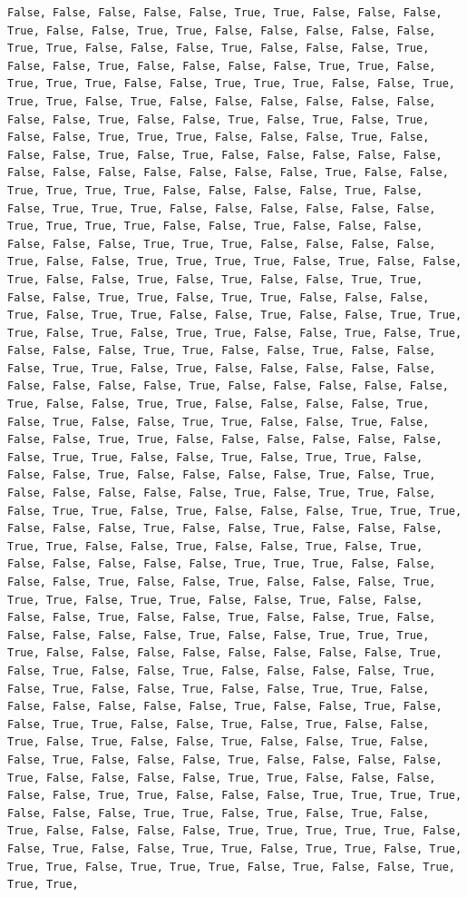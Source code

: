 \documentclass[
  letterpaper,
  DIV=11,
  numbers=noendperiod]{scrartcl}
\begin{document}
\begin{verbatim}
False, False, False, False, False, True, True, False, False, False, True, False, False, True, True, False, False, False, False, False, True, True, False, False, False, True, False, False, False, True, False, False, True, False, False, False, False, True, True, False, True, True, True, False, False, True, True, True, False, False, True, True, True, False, True, False, False, False, False, False, False, False, False, True, False, False, True, False, True, False, True, False, False, True, True, True, False, False, False, True, False, False, False, True, False, True, False, False, False, False, False, False, False, False, False, False, False, False, True, False, False, True, True, True, True, False, False, False, False, True, False, False, True, True, True, False, False, False, False, False, False, True, True, True, True, False, False, True, False, False, False, False, False, False, True, True, True, False, False, False, False, True, False, False, True, True, True, True, False, True, False, False, True, False, False, True, False, True, False, False, True, True, False, False, True, True, False, True, True, False, False, False, True, False, True, True, False, False, True, False, False, True, True, True, False, True, False, True, True, False, False, True, False, True, False, False, False, True, True, False, False, True, False, False, False, True, True, False, True, False, False, False, False, False, False, False, False, False, True, False, False, False, False, False, True, False, False, True, True, False, False, False, False, True, False, True, False, False, True, True, False, False, True, False, False, False, True, True, False, False, False, False, False, False, False, True, True, False, False, True, False, True, True, False, False, False, True, False, False, False, False, True, False, True, False, False, False, False, False, True, False, True, True, False, False, True, True, False, True, False, False, False, True, True, True, False, False, False, True, False, False, True, False, False, False, True, True, False, False, True, False, False, True, False, True, False, False, False, False, False, True, True, True, False, False, False, False, True, False, False, True, False, False, False, True, True, True, False, True, True, False, False, True, False, False, False, False, True, False, False, True, False, False, True, False, False, False, False, False, True, False, False, True, True, True, True, False, False, False, False, False, False, False, False, True, False, True, False, False, True, False, False, False, False, True, False, True, False, False, True, False, False, True, True, False, False, False, False, False, False, True, False, False, True, False, False, True, True, False, False, True, False, True, False, False, True, False, True, False, False, True, False, False, True, False, False, True, False, False, False, True, False, False, False, False, True, False, False, False, False, True, True, False, False, False, False, False, True, True, False, False, False, True, True, True, True, False, False, False, True, True, False, True, False, True, False, True, False, False, False, False, True, True, True, True, True, False, False, True, False, False, True, True, False, True, True, False, True, True, True, False, True, True, True, False, True, False, False, True, True, True, 
\end{verbatim}
\end{document}
